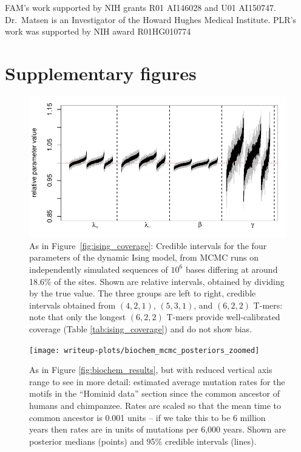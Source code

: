 \documentclass{article}
\theoremstyle{plain}
\theoremstyle{definition}
\newcommand{\beginsupplement}{%
        \setcounter{table}{0}
        \renewcommand{\thetable}{S\arabic{table}}%
        \setcounter{figure}{0}
        \renewcommand{\thefigure}{S\arabic{figure}}%
     }
\begin{document}
FAM's work supported by NIH grants R01 AI146028 and U01 AI150747.
Dr.\ Matsen is an Investigator of the Howard Hughes Medical Institute.
PLR's work was supported by NIH award R01HG010774




\clearpage

\beginsupplement

\appendix

\section{Supplementary figures}

\begin{figure}[h!]
    \begin{center}
        \includegraphics{writeup-plots/coverage_results_all}
    \end{center}
    \caption{
        As in Figure~\ref{fig:ising_coverage}:
        Credible intervals for the four parameters of the dynamic Ising model,
        from MCMC runs on independently simulated sequences of $10^6$ bases
        differing at around 18.6\% of the sites.
        Shown are relative intervals, obtained by dividing by the true value.
        The three groups are left to right, credible intervals obtained from $(4,2,1)$, $(5,3,1)$, and $(6,2,2)$ T-mers:
        note that only the longest $(6,2,2)$ T-mers provide well-calibrated coverage (Table \ref{tab:ising_coverage})
        and do not show bias.
        \label{fig:all_ising_coverage}}
\end{figure}

\begin{figure}
    \begin{center}
        \texttt{[image: writeup-plots/biochem\_mcmc\_posteriors\_zoomed]}
    \end{center}
    \caption{
        As in Figure \ref{fig:biochem_results}, but with reduced vertical axis range
        to see in more detail:
        estimated average mutation rates
        for the motifs in the ``Hominid data'' section
        since the common ancestor of humans and chimpanzee.
        Rates are scaled so that the mean time to common ancestor is 0.001 units --
        if we take this to be 6 million years \citep{scally2012insights}
        then rates are in units of mutations per 6,000 years.
        Shown are posterior medians (points) and 95\% credible intervals (lines).
        \label{sfig:biochem_results_zoom}}
\end{figure}
\end{document}
